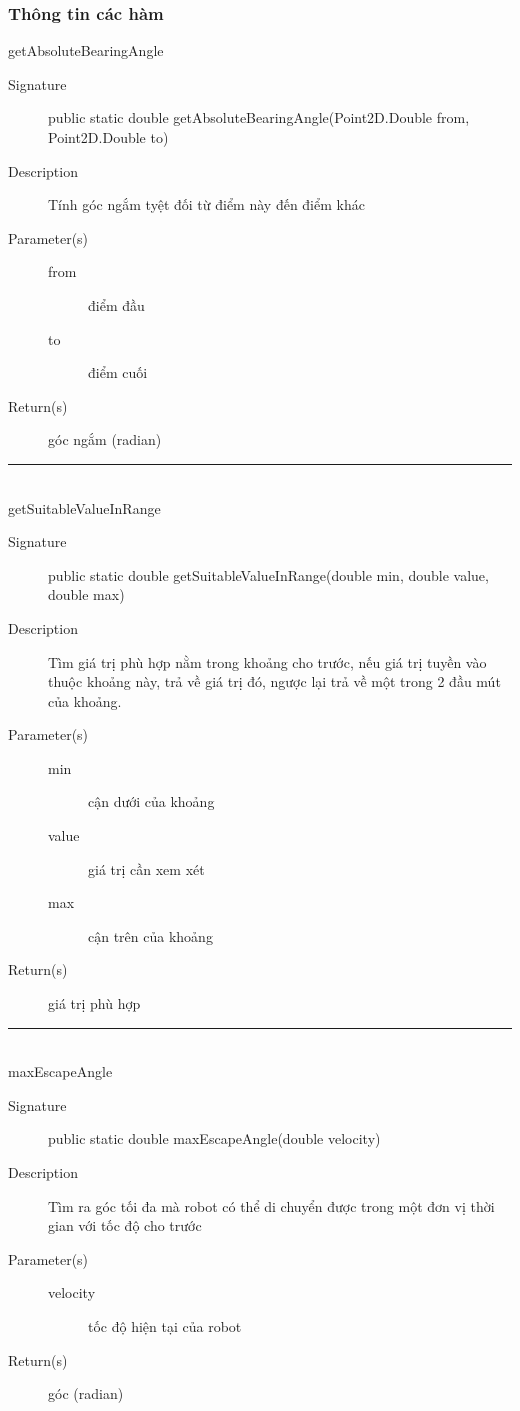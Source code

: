 \documentclass[14pt]{article}
\newcommand{\sep}{\rule{\textwidth}{0.007pt}\\}
\begin{document}
\subsubsection{Thông tin các hàm}
getAbsoluteBearingAngle
\begin{description}
	\item[Signature]public static double getAbsoluteBearingAngle(Point2D.Double from,
			Point2D.Double to)
	\item[Description] Tính góc ngắm tyệt đối từ điểm này đến điểm khác
	\item[Parameter(s)]
	\begin{description}
		\item[from] điểm đầu
		\item[to] điểm cuối
	\end{description}
	\item[Return(s)] góc ngắm (radian)
\end{description}
\sep
getSuitableValueInRange
\begin{description}
	\item[Signature]public static double getSuitableValueInRange(double min, double value,
			double max)
	\item[Description] Tìm giá trị phù hợp nằm trong khoảng cho trước, nếu giá trị tuyền vào thuộc khoảng này, trả về giá trị đó, ngược lại trả về một trong 2 đầu mút của khoảng.
	\item[Parameter(s)]
	\begin{description}
		\item[min] cận dưới của khoảng
		\item[value] giá trị cần xem xét
		\item[max] cận trên của khoảng
	\end{description}
	\item[Return(s)] giá trị phù hợp
\end{description}
\sep
maxEscapeAngle
\begin{description}
	\item[Signature]public static double maxEscapeAngle(double velocity)
	\item[Description] Tìm ra góc tối đa mà robot có thể di chuyển được trong một đơn vị thời gian với tốc độ cho trước
	\item[Parameter(s)]
	\begin{description}
		\item[velocity] tốc độ hiện tại của robot
	\end{description}
	\item[Return(s)] góc (radian)
\end{description}
\end{document}
